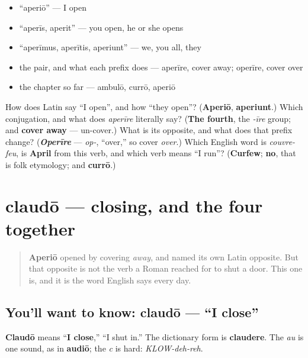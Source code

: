 \begin{itemize}
\raggedright
  \item \textquotedblleft{}aperiō\textquotedblright{} — I open
  \item \textquotedblleft{}aperīs, aperit\textquotedblright{} — you open, he or she opens
  \item \textquotedblleft{}aperīmus, aperītis, aperiunt\textquotedblright{} — we, you all, they
  \item the pair, and what each prefix does — aperīre, cover away; operīre, cover over
  \item the chapter so far — ambulō, currō, aperiō
\end{itemize}

\begin{tcolorbox}[breakable,colback=teal!4,colframe=teal!35!black,title={Before you move on}]
How does Latin say \textquotedblleft{}I open\textquotedblright{}, and how \textquotedblleft{}they open\textquotedblright{}? (\textbf{Aperiō}, \textbf{aperiunt}.) Which conjugation, and what does \emph{aperīre} literally say? (\textbf{The fourth}, the \emph{-īre} group; and \textbf{cover away} — un-cover.) What is its opposite, and what does that prefix change? (\emph{\textbf{Operīre}} — \emph{op-}, \textquotedblleft{}over,\textquotedblright{} so cover \emph{over}.) Which English word is \emph{couvre-feu}, is \textbf{April} from this verb, and which verb means \textquotedblleft{}I run\textquotedblright{}? (\textbf{Curfew}; \textbf{no}, that is folk etymology; and \textbf{currō}.)
\end{tcolorbox}
\section[claudō, claudere]{claudō — closing, and the four together}

\label{lesson:LA-C41-claudo}



\begin{quote}
\textbf{Aperiō} opened by covering \emph{away}, and named its own Latin opposite. But that opposite is not the verb a Roman reached for to shut a door. This one is, and it is the word English says every day.
\end{quote}

\subsection*{You'll want to know: claudō — \textquotedblleft{}I close\textquotedblright{}}
\textbf{Claudō} means \textquotedblleft{}\textbf{I close},\textquotedblright{} \textquotedblleft{}I shut in.\textquotedblright{} The dictionary form is \textbf{claudere}. The \emph{au} is one sound, as in \textbf{audiō}; the \emph{c} is hard: \emph{KLOW-deh-reh}.

